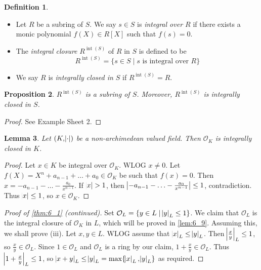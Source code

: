 \documentclass[11pt]{article}
\theoremstyle{definition}
\newtheorem{definition}{Definition}[subsection]
\theoremstyle{plain}
\newtheorem{proposition}[definition]{Proposition}
\newtheorem{lemma}[definition]{Lemma}
\theoremstyle{remark}
\renewcommand{\qedsymbol}{$\blacksquare$}
\DeclareMathOperator{\Int}{int}
\newcommand{\cO}{\mathcal{O}}
\begin{document}
\begin{definition}\label{def:6_6}\phantom{}
    \begin{itemize}
        \item Let $R$ be a subring of $S$. We say $s \in S$ is \emph{integral over $R$} if there exists a monic polynomial $f(X) \in R[X]$ such that $f(s) = 0$.
        \item The \emph{integral closure} $R^{\Int(S)}$ of $R$ in $S$ is defined to be
            \begin{equation*}
                R^{\Int(S)} = \{s \in S \mid s \text{ is integral over } R\}
            \end{equation*}
        \item We say $R$ is \emph{integrally closed in $S$} if $R^{\Int(S)} = R$.
    \end{itemize}
\end{definition}

\begin{proposition}\label{prop:6_7}
    $R^{\Int(S)}$ is a subring of $S$. Moreover, $R^{\Int(S)}$ is integrally closed in $S$.
\end{proposition}
\begin{proof}
    See Example Sheet 2.
\end{proof}

\begin{lemma}\label{lem:6_8}
    Let $(K, \abs{\cdot})$ be a non-archimedean valued field. Then $\cO_K$ is integrally closed in $K$.
\end{lemma}
\begin{proof}
    Let $x \in K$ be integral over $\cO_K$. WLOG $x \neq 0$. Let $f(X) = X^n + a_{n-1} + \ldots + a_0 \in \cO_K$  be such that $f(x) = 0$. Then $x = -a_{n-1} - \ldots - \frac{a_0}{x^{n-1}}$. If $\abs{x} > 1$, then $\abs{-a_{n-1} - \ldots - \frac{a_0}{x^{n-1}}} \le 1$, contradiction. Thus $\abs{x} \le 1$, so $x \in \cO_K$.
\end{proof}

\begin{proof}[Proof of \autoref{thm:6_1} (continued)]
    Set $\cO_L = \{y \in L \mid \abs{y}_L \le 1\}$. We claim that $\cO_L$ is the integral closure of $\cO_K$ in $L$, which will be proved in \autoref{lem:6_9}. Assuming this, we shall prove (iii). Let $x, y \in L$. WLOG assume that $\abs{x}_L \le \abs{y}_L$. Then $\abs{\frac{x}{y}}_L \le 1$, so $\frac{x}{y} \in \cO_L$. Since $1 \in \cO_L$ and $\cO_L$ is a ring by our claim, $1 + \frac{x}{y} \in \cO_L$. Thus $\abs{1 + \frac{x}{y}}_L \le 1$, so $\abs{x + y}_L \le \abs{y}_L = \max \{\abs{x}_L, \abs{y}_L\}$ as required.
    \renewcommand*{\qedsymbol}{}
\end{proof}
\end{document}
